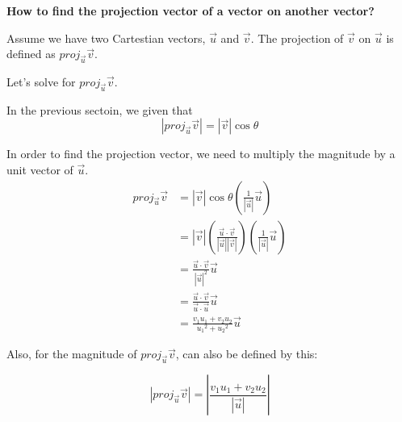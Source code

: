 \textbf{How to find the projection vector of a vector on another vector?}

Assume we have two Cartestian vectors, $\vec{u}$ and $\vec{v}$. The projection of $\vec{v}$ on $\vec{u}$ is defined as 
$proj_{\vec{u}}\vec{v}$.

Let's solve for $proj_{\vec{u}}\vec{v}$. 

In the previous sectoin, we given that 
$$\left|proj_{\vec{u}}\vec{v}\right| = \left|\vec{v}\right|\cos \theta$$

In order to find the projection vector, we need to multiply the magnitude by a unit vector of $\vec{u}$.
\begin{align*}
    proj_{\vec{u}} \vec{v} &= \left|\vec{v}\right| \cos \theta \left(\frac{1}{\left|\vec{u}\right|}\vec{u}\right)\\
    &= \left|\vec{v}\right| \left(
        \frac{\vec{u} \cdot \vec{v}}{\left|\vec{u}\right| \left|\vec{v}\right|}
    \right) \left(\frac{1}{\left|\vec{u}\right|}\vec{u}\right) \\
    &= \frac{\vec{u} \cdot \vec{v}}{\left|\vec{u}\right|^2} \vec{u} \\
    &= \frac{\vec{u} \cdot \vec{v}}{\vec{u} \cdot \vec{u}} \vec{u} \\
    &= \frac{
        v_1u_1 + v_2u_2
    }{
        {u_1}^2 + {u_2}^2
    } \vec{u}
\end{align*}

Also, for the magnitude of $proj_{\vec{u}}\vec{v}$, can also be defined by this:

\[
    \left|proj_{\vec{u}}\vec{v}\right| = \left |\frac{v_1u_1 + v_2u_2}{\left|\vec{u}\right|} \right |
\]

\newpage